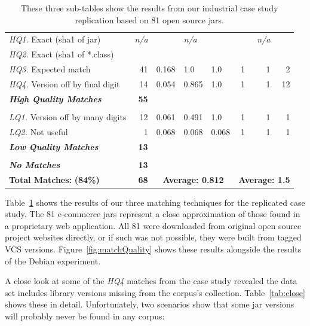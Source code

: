 \begin{table}[h]
\begin{tabular}[htbp]{l|r|lll|rrr}
        \emph{HQ1.} Exact (sha1 of jar)        & \multicolumn{1}{c|}{\emph{n/a}} & & \emph{n/a} & & & \emph{n/a} &  \\
        \emph{HQ2.} Exact (sha1 of *.class)    & & & & & & & \\
        \emph{HQ3.} Expected match             &  41          & 0.168 & 1.0    & 1.0   & 1    & 1    &  2   \\
        \emph{HQ4.} Version off by final digit &  14          & 0.054 & 0.865  & 1.0   & 1    & 1    & 12   \\
        \emph{\textbf{High Quality Matches}}   & \textbf{55}  &       &        &       &      &      &      \\
        & & & & & & & \\
        \emph{LQ1.} Version off by many digits &  12          & 0.061 & 0.491  & 1.0   & 1    & 1    &  1   \\
        \emph{LQ2.} Not useful                 &   1          & 0.068 & 0.068  & 0.068 & 1    & 1    &  1   \\
        \emph{\textbf{Low Quality Matches}}    & \textbf{13}  &       &        &       &      &      &      \\
        & & & & & & & \\
        \emph{\textbf{No Matches}}             & \textbf{13}  &       &        &       &      &      &      \\
        \hline
        \textbf{Total Matches:} \hspace{3em}    \textbf{(84\%)} &  \textbf{68}   & \multicolumn{3}{c|}{\textbf{Average: 0.812}}  & \multicolumn{3}{c}{\textbf{Average: 1.5}} \\
    \end{tabular}
    \caption{These three sub-tables show the results from our industrial case
    study replication based on 81 open source jars.}
    \label{tab:bank}
\end{table}

Table~\ref{tab:bank} shows the results of our three matching techniques for
the replicated case study.  The 81 e-commerce jars represent a close
approximation of those found in a proprietary web application.  All 81 were
downloaded from original open source project websites directly, or if such was not
possible, they were built from tagged VCS versions.
Figure~\ref{fig:matchQuality} shows these results alongside the results of
the Debian experiment.

A close look at some of the \emph{HQ4} matches from the case study revealed
the data set includes library versions missing from the corpus's
collection.  Table~\ref{tab:close} shows these in detail.  Unfortunately,
two scenarios show that some jar versions will probably never be found in
any corpus:

